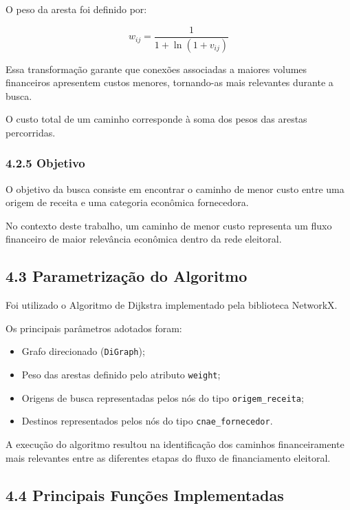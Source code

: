 \documentclass[11pt]{article}
\providecommand{\tightlist}{%
      \setlength{\itemsep}{0pt}\setlength{\parskip}{0pt}}
\begin{document}
O peso da aresta foi definido por:

\[
w_{ij}=\frac{1}{1+\ln(1+v_{ij})}
\]

Essa transformação garante que conexões associadas a maiores volumes
financeiros apresentem custos menores, tornando-as mais relevantes
durante a busca.

O custo total de um caminho corresponde à soma dos pesos das arestas
percorridas.

\subsubsection{4.2.5 Objetivo}\label{objetivo}

O objetivo da busca consiste em encontrar o caminho de menor custo entre
uma origem de receita e uma categoria econômica fornecedora.

No contexto deste trabalho, um caminho de menor custo representa um
fluxo financeiro de maior relevância econômica dentro da rede eleitoral.

\subsection{4.3 Parametrização do
Algoritmo}\label{parametrizauxe7uxe3o-do-algoritmo}

Foi utilizado o Algoritmo de Dijkstra implementado pela biblioteca
NetworkX.

Os principais parâmetros adotados foram:

\begin{itemize}
\tightlist
\item
  Grafo direcionado (\texttt{DiGraph});
\item
  Peso das arestas definido pelo atributo \texttt{weight};
\item
  Origens de busca representadas pelos nós do tipo
  \texttt{origem\_receita};
\item
  Destinos representados pelos nós do tipo \texttt{cnae\_fornecedor}.
\end{itemize}

A execução do algoritmo resultou na identificação dos caminhos
financeiramente mais relevantes entre as diferentes etapas do fluxo de
financiamento eleitoral.

\subsection{4.4 Principais Funções
Implementadas}\label{principais-funuxe7uxf5es-implementadas}
\end{document}
